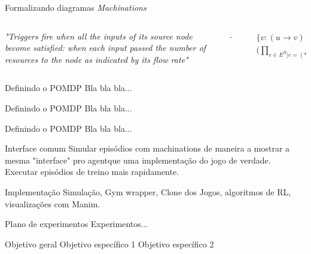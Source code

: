 \documentclass[aspectratio=169]{beamer}
\begin{document}
\begin{frame}{Formalizando diagramas \textit{Machinations}}

    \begin{columns}
        \begin{column}{0.4\textwidth}
            \vspace{0.75cm}

            \textit{"Triggers fire when all the inputs of its source node become satisfied: when each input passed the number of resources to the node as indicated by its flow rate"}
        \end{column}
        \begin{column}{0.1\textwidth}
            \begin{center}
                $\rightarrow$
            \end{center}
        \end{column}
        \begin{column}{0.4\textwidth}
            \vspace{0.75cm}
            \begin{align*}
                &\{v: (u \rightarrow v) \in E^G\ | \\\ &\Big(\prod_{e \in E^R | e = (* \rightarrow u)}{\Delta e(t-1) = T_e \Big)} = 1 \}\\
            \end{align*}
        \end{column}
    \end{columns}
\end{frame}

\begin{frame}{Definindo o POMDP}
    Bla bla bla...
\end{frame}

\begin{frame}{Definindo o POMDP}
    Bla bla bla...
\end{frame}

\begin{frame}{Definindo o POMDP}
    Bla bla bla...
\end{frame}

\begin{frame}{Interface comum}
    Simular episódios com machinations de maneira a mostrar a mesma "interface" pro agentque uma implementação do jogo de verdade. Executar episódios de treino mais rapidamente.
\end{frame}

\begin{frame}{Implementação}
    Simulação, Gym wrapper, Clone dos Jogos, algoritmos de RL, visualizações com Manim.
\end{frame}

\begin{frame}{Plano de experimentos}
    Experimentos...
    \begin{outline}
        \1 Objetivo geral
            \2 Objetivo específico 1
            \2 Objetivo específico 2
    \end{outline}
\end{frame}

\begin{frame}
    \printbibliography
\end{frame}
\end{document}
